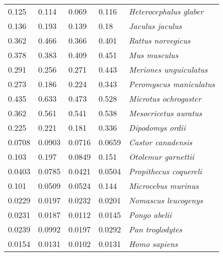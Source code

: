 \begin{tabular}{lllll}
          0.125 &           0.114 &           0.069 &          0.116 &                \textit{Heterocephalus glaber} \\
          0.136 &           0.193 &           0.139 &           0.18 &                      \textit{Jaculus jaculus} \\
          0.362 &           0.466 &           0.366 &          0.401 &                    \textit{Rattus norvegicus} \\
          0.378 &           0.383 &           0.409 &          0.451 &                         \textit{Mus musculus} \\
          0.291 &           0.256 &           0.271 &          0.443 &                \textit{Meriones unguiculatus} \\
          0.273 &           0.186 &           0.224 &          0.343 &               \textit{Peromyscus maniculatus} \\
          0.435 &           0.633 &           0.473 &          0.528 &                 \textit{Microtus ochrogaster} \\
          0.362 &           0.561 &           0.541 &          0.538 &                 \textit{Mesocricetus auratus} \\
          0.225 &           0.221 &           0.181 &          0.336 &                      \textit{Dipodomys ordii} \\
         0.0708 &          0.0903 &          0.0716 &         0.0659 &                    \textit{Castor canadensis} \\
          0.103 &           0.197 &          0.0849 &          0.151 &                   \textit{Otolemur garnettii} \\
         0.0403 &          0.0785 &          0.0421 &         0.0504 &                \textit{Propithecus coquereli} \\
          0.101 &          0.0509 &          0.0524 &          0.144 &                   \textit{Microcebus murinus} \\
         0.0229 &          0.0197 &          0.0232 &         0.0201 &                  \textit{Nomascus leucogenys} \\
         0.0231 &          0.0187 &          0.0112 &         0.0145 &                         \textit{Pongo abelii} \\
         0.0239 &          0.0992 &          0.0197 &         0.0292 &                      \textit{Pan troglodytes} \\
         0.0154 &          0.0131 &          0.0102 &         0.0131 &                         \textit{Homo sapiens} \\

\end{tabular}
